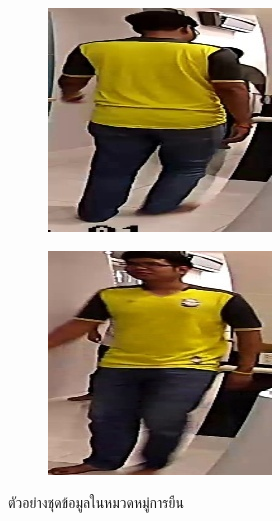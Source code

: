 \begin{figure}[!ht]
\begin{subfigure}[b]{0.45\linewidth}
    \end{subfigure}
    \begin{subfigure}[b]{0.45\linewidth}
      \includegraphics[width=\linewidth]{appendix/walk/000_CXS0_D0_000900.jpg}
    \end{subfigure}
    \begin{subfigure}[b]{0.45\linewidth}
      \includegraphics[width=\linewidth]{appendix/walk/000_CXS0_D0_000963.jpg}
    \end{subfigure}
    \caption{ตัวอย่างชุดข้อมูลในหมวดหมู่การยืน}
    \label{fig:result_track}
 \end{figure}

